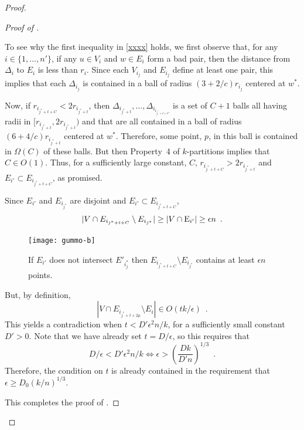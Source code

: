 \documentclass{patmorin}
\begin{document}
\begin{proof}
\begin{proof}[Proof of ]
\begin{enumerate}
    To see why the first inequality in \eqref{xxxx} holds, we first
    observe that, for any $i\in\{1,\ldots,n'\}$, if any $u\in V_i$
    and $w\in E_i$ form a bad pair, then the distance from $\Delta_i$
    to $E_i$ is less than $r_i$.  Since each $V_{i_j}$ and $E_{i_j}$
    define at least one pair, this implies that each $\Delta_{i_j}$ is
    contained in a ball of radius $(3+2/c)r_{i_j}$ centered at $w^*$.

    Now, if $r_{i_{j^*+t+C}} < 2r_{i_{j^*+t}}$, then
    $\Delta_{i_{j^*+t}},\ldots,\Delta_{i_{i_{j^*+t+C}}}$ is a set of
    $C+1$ balls all having radii in $[r_{i_{j^*+t}},2r_{i_{j^*+t}})$ and
    that are all contained in a ball of radius $(6+4/c)r_{i_{j^*+t}}$
    centered at $w^*$.  Therefore, some point, $p$, in this ball is
    contained in $\Omega(C)$ of these balls.  But then Property~4 of
    $k$-partitions implies that $C\in O(1)$.  Thus, for a sufficiently
    large constant, $C$, $r_{i_{j^*+t+C}} > 2r_{i_{j^*+t}}$ and
    $E_{i'}\subset E_{i_{j^*+t+C}}$, as promised.

    Since $E_{i'}$ and $E_{i_{j^*}}$ are disjoint and $E_{i'}\subset
    E_{i_{j^*+t+C}}$,
    \[
      |V\cap E_{i_{j^*+t+C}}\setminus E_{i_{j^*}}| 
         \ge |V\cap\mathrm{E}_{i'}| \ge \epsilon n \enspace .
    \]
    \begin{figure}
      \begin{center}
        \texttt{[image: gummo-b]}
        \caption{If $E_{i'}$ does not intersect $E'_{i_j^*}$ then
          $E_{i_{j^*+t+C}}\setminus E_{i_{j^*}}$ contains at least
          $\epsilon n$ points.}
      \end{center}
    \end{figure}
    But, by definition, 
    \[
      |V\cap E_{i_{j^*+t+2\mu}}\setminus E_i| 
         \in O(tk/\epsilon) \enspace .
    \]
    This yields a contradiction when $t<D' \epsilon^2 n/k$, for a
    sufficiently small constant $D'>0$.  Note that we have already set
    $t=D/\epsilon$, so this requires that
    \[
       D/\epsilon < D'\epsilon ^2 n/k \Leftrightarrow \epsilon 
           > \left(\frac{Dk}{D'n}\right)^{1/3} \enspace .
    \]
    Therefore, the condition on $t$ is already contained in the
    requirement that $\epsilon \ge D_0(k/n)^{1/3}$.
  \end{enumerate}
  This completes the proof of .
  \end{proof}



\end{proof}
\end{document}
